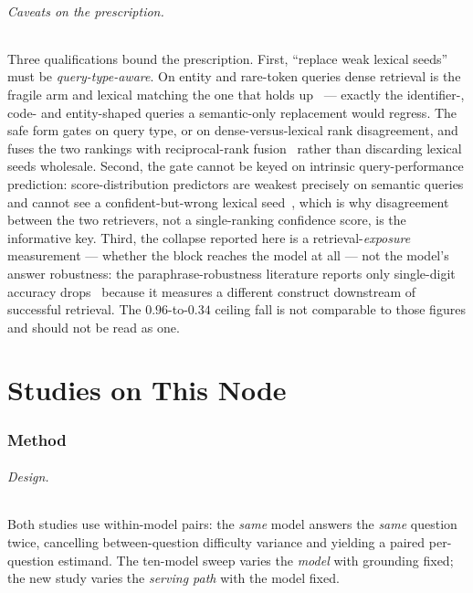 \documentclass[10pt,twocolumn]{article}
\begin{document}
\paragraph{Caveats on the prescription.} Three qualifications bound the prescription. First, ``replace weak lexical seeds'' must be \emph{query-type-aware}. On entity and rare-token queries dense retrieval is the fragile arm and lexical matching the one that holds up~\cite{entityquestions2022} --- exactly the identifier-, code- and entity-shaped queries a semantic-only replacement would regress. The safe form gates on query type, or on dense-versus-lexical rank disagreement, and fuses the two rankings with reciprocal-rank fusion~\cite{rrf2009} rather than discarding lexical seeds wholesale. Second, the gate cannot be keyed on intrinsic query-performance prediction: score-distribution predictors are weakest precisely on semantic queries and cannot see a confident-but-wrong lexical seed~\cite{qppneural2023}, which is why disagreement between the two retrievers, not a single-ranking confidence score, is the informative key. Third, the collapse reported here is a retrieval-\emph{exposure} measurement --- whether the block reaches the model at all --- not the model's answer robustness: the paraphrase-robustness literature reports only single-digit accuracy drops~\cite{benchrobust2025} because it measures a different construct downstream of successful retrieval. The $0.96$-to-$0.34$ ceiling fall is not comparable to those figures and should not be read as one.


\part{Studies on This Node}

\section{Method}\label{sec:method}
\paragraph{Design.} Both studies use within-model pairs: the \emph{same} model answers the \emph{same} question twice, cancelling between-question difficulty variance and yielding a paired per-question estimand. The ten-model sweep varies the \emph{model} with grounding fixed; the new study varies the \emph{serving path} with the model fixed.
\end{document}
